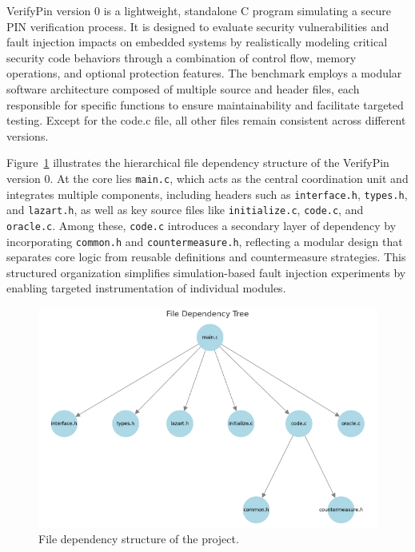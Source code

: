 VerifyPin version 0 is a lightweight, standalone C program simulating a secure PIN verification process. It is designed to evaluate security vulnerabilities and fault injection impacts on embedded systems by realistically modeling critical security code behaviors through a combination of control flow, memory operations, and optional protection features. The benchmark employs a modular software architecture composed of multiple source and header files, each responsible for specific functions to ensure maintainability and facilitate targeted testing. Except for the code.c file, all other files remain consistent across different versions.

Figure~\ref{fig:file-tree} illustrates the hierarchical file dependency structure of the VerifyPin version 0. At the core lies \texttt{main.c}, which acts as the central coordination unit and integrates multiple components, including headers such as \texttt{interface.h}, \texttt{types.h}, and \texttt{lazart.h}, as well as key source files like \texttt{initialize.c}, \texttt{code.c}, and \texttt{oracle.c}. Among these, \texttt{code.c} introduces a secondary layer of dependency by incorporating \texttt{common.h} and \texttt{countermeasure.h}, reflecting a modular design that separates core logic from reusable definitions and countermeasure strategies. This structured organization simplifies simulation-based fault injection experiments by enabling targeted instrumentation of individual modules.

\begin{figure}
    \centering
    \includegraphics[width=0.75\linewidth]{Chapitre2/figures/tree.png}
    \caption{File dependency structure of the project. }
    \label{fig:file-tree}
\end{figure}

